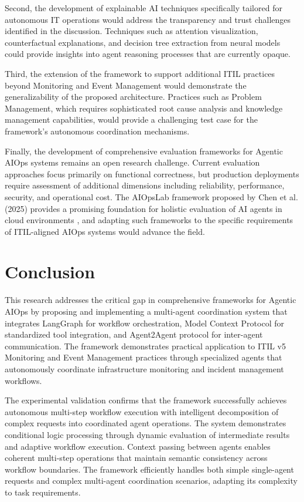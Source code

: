 \documentclass{article}
\begin{document}
Second, the development of explainable AI techniques specifically tailored for autonomous IT operations would address the transparency and trust challenges identified in the discussion. Techniques such as attention visualization, counterfactual explanations, and decision tree extraction from neural models could provide insights into agent reasoning processes that are currently opaque.

Third, the extension of the framework to support additional ITIL practices beyond Monitoring and Event Management would demonstrate the generalizability of the proposed architecture. Practices such as Problem Management, which requires sophisticated root cause analysis and knowledge management capabilities, would provide a challenging test case for the framework's autonomous coordination mechanisms.

Finally, the development of comprehensive evaluation frameworks for Agentic AIOps systems remains an open research challenge. Current evaluation approaches focus primarily on functional correctness, but production deployments require assessment of additional dimensions including reliability, performance, security, and operational cost. The AIOpsLab framework proposed by Chen et al. (2025) provides a promising foundation for holistic evaluation of AI agents in cloud environments \cite{chen2025}, and adapting such frameworks to the specific requirements of ITIL-aligned AIOps systems would advance the field.

\section{Conclusion}

This research addresses the critical gap in comprehensive frameworks for Agentic AIOps by proposing and implementing a multi-agent coordination system that integrates LangGraph for workflow orchestration, Model Context Protocol for standardized tool integration, and Agent2Agent protocol for inter-agent communication. The framework demonstrates practical application to ITIL v5 Monitoring and Event Management practices through specialized agents that autonomously coordinate infrastructure monitoring and incident management workflows.

The experimental validation confirms that the framework successfully achieves autonomous multi-step workflow execution with intelligent decomposition of complex requests into coordinated agent operations. The system demonstrates conditional logic processing through dynamic evaluation of intermediate results and adaptive workflow execution. Context passing between agents enables coherent multi-step operations that maintain semantic consistency across workflow boundaries. The framework efficiently handles both simple single-agent requests and complex multi-agent coordination scenarios, adapting its complexity to task requirements.
\end{document}
